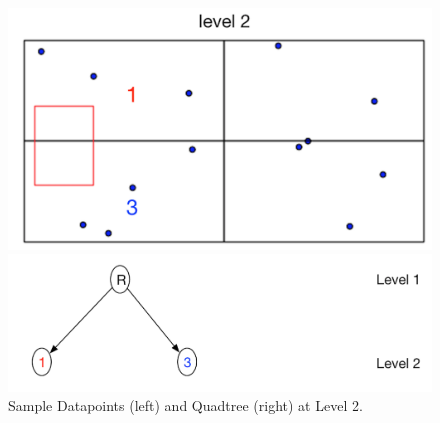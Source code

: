 \begin{figure}[ht]
  \centering
  \vspace{0.5in}
  \begin{minipage}[b]{0.35\textwidth}
    \includegraphics[width=\textwidth]{Images/NoPointQuad2}
  \end{minipage}
  \hfill
  \begin{minipage}[b]{0.6\textwidth}
    \includegraphics[width=\textwidth]{Images/NoPoints3_1}
  \end{minipage}
  \vspace{0.5in}
  \caption{Sample Datapoints (left) and Quadtree (right) at Level 2.}
  \label{fig:2Quad_NoPoints}
\end{figure}



